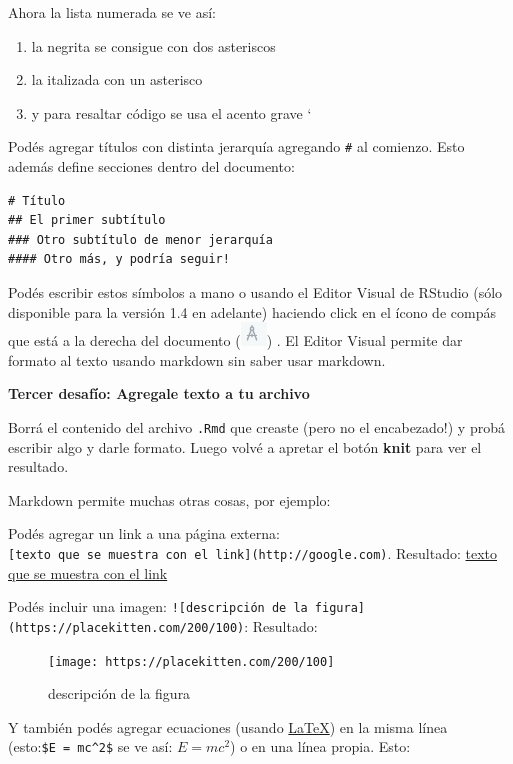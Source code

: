 \documentclass[
  openany]{book}
\providecommand{\tightlist}{%
  \setlength{\itemsep}{0pt}\setlength{\parskip}{0pt}}
\begin{document}
Ahora la lista numerada se ve así:

\begin{enumerate}
\def\labelenumi{\arabic{enumi}.}
\tightlist
\item
  la negrita se consigue con dos asteriscos
\item
  la italizada con un asterisco
\item
  y para resaltar código se usa el acento grave `
\end{enumerate}

Podés agregar títulos con distinta jerarquía agregando \texttt{\#} al comienzo.
Esto además define secciones dentro del documento:

\begin{verbatim}
# Título
## El primer subtítulo
### Otro subtítulo de menor jerarquía
#### Otro más, y podría seguir!
\end{verbatim}

Podés escribir estos símbolos a mano o usando el Editor Visual de RStudio (sólo disponible para la versión 1.4 en adelante) haciendo click en el ícono de compás que está a la derecha del documento (\includegraphics{img/icono-editor-visual.png}) .
El Editor Visual permite dar formato al texto usando markdown sin saber usar markdown.

\textbf{Tercer desafío: Agregale texto a tu archivo}

Borrá el contenido del archivo \texttt{.Rmd} que creaste (pero no el encabezado!) y probá escribir algo y darle formato.
Luego volvé a apretar el botón \textbf{knit} para ver el resultado.

Markdown permite muchas otras cosas, por ejemplo:

Podés agregar un link a una página externa: \texttt{{[}texto\ que\ se\ muestra\ con\ el\ link{]}(http://google.com)}.
Resultado: \href{http://google.com}{texto que se muestra con el link}

Podés incluir una imagen: \texttt{!{[}descripción\ de\ la\ figura{]}(https://placekitten.com/200/100)}: Resultado:

\begin{figure}
\centering
\texttt{[image: https://placekitten.com/200/100]}
\caption{descripción de la figura}
\end{figure}

Y también podés agregar ecuaciones (usando \href{https://es.wikipedia.org/wiki/LaTeX}{LaTeX}) en la misma línea (esto:\texttt{\$E\ =\ mc\^{}2\$} se ve así: \(E = mc^2\)) o en una línea propia.
Esto:
\end{document}
